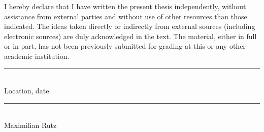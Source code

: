 I hereby declare that I have written the present thesis
independently, without assistance from external parties and without
use of other resources than those indicated.
The ideas taken directly or indirectly from external sources
(including electronic sources) are duly acknowledged in the text.
The material, either in full or in part, has not been previously
submitted for grading at this or any other academic institution.\\
\parbox{\textwidth}{
    \vspace{3cm}
    \parbox{7cm}{
        \rule{5cm}{0.5pt}\\
        Location, date
    }
    \hfill
    \parbox{7cm}{
        \rule{5cm}{0.5pt}\\
        Maximilian Rutz
    }
}